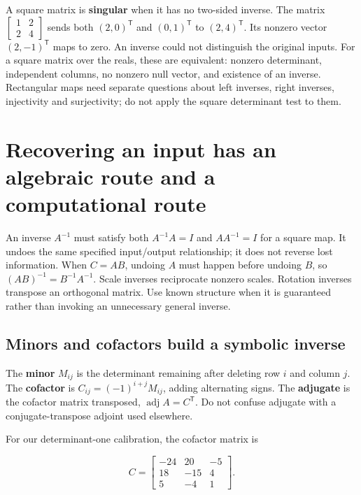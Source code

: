 A square matrix is \textbf{singular} when it has no two-sided inverse. The matrix \(\begin{bmatrix}1&2\\2&4\end{bmatrix}\) sends both \((2,0)^{\mathsf T}\) and \((0,1)^{\mathsf T}\) to \((2,4)^{\mathsf T}\). Its nonzero vector \((2,-1)^{\mathsf T}\) maps to zero. An inverse could not distinguish the original inputs. For a square matrix over the reals, these are equivalent: nonzero determinant, independent columns, no nonzero null vector, and existence of an inverse. Rectangular maps need separate questions about left inverses, right inverses, injectivity and surjectivity; do not apply the square determinant test to them.

\section{Recovering an input has an algebraic route and a computational route}\label{01-foundations-i-ch018-recovering-an-input-has-an-algebraic-route-and-a-computational-route}

An inverse \(A^{-1}\) must satisfy both \(A^{-1}A=I\) and \(AA^{-1}=I\) for a square map. It undoes the same specified input/output relationship; it does not reverse lost information. When \(C=AB\), undoing \(A\) must happen before undoing \(B\), so \((AB)^{-1}=B^{-1}A^{-1}\). Scale inverses reciprocate nonzero scales. Rotation inverses transpose an orthogonal matrix. Use known structure when it is guaranteed rather than invoking an unnecessary general inverse.

\subsection{Minors and cofactors build a symbolic inverse}\label{01-foundations-i-ch018-minors-and-cofactors-build-a-symbolic-inverse}

The \textbf{minor} \(M_{ij}\) is the determinant remaining after deleting row \(i\) and column \(j\). The \textbf{cofactor} is \(C_{ij}=(-1)^{i+j}M_{ij}\), adding alternating signs. The \textbf{adjugate} is the cofactor matrix transposed, \(\operatorname{adj}A=C^{\mathsf T}\). Do not confuse adjugate with a conjugate-transpose adjoint used elsewhere.

For our determinant-one calibration, the cofactor matrix is

\[
C=\begin{bmatrix}-24&20&-5\\18&-15&4\\5&-4&1\end{bmatrix}.
\]


